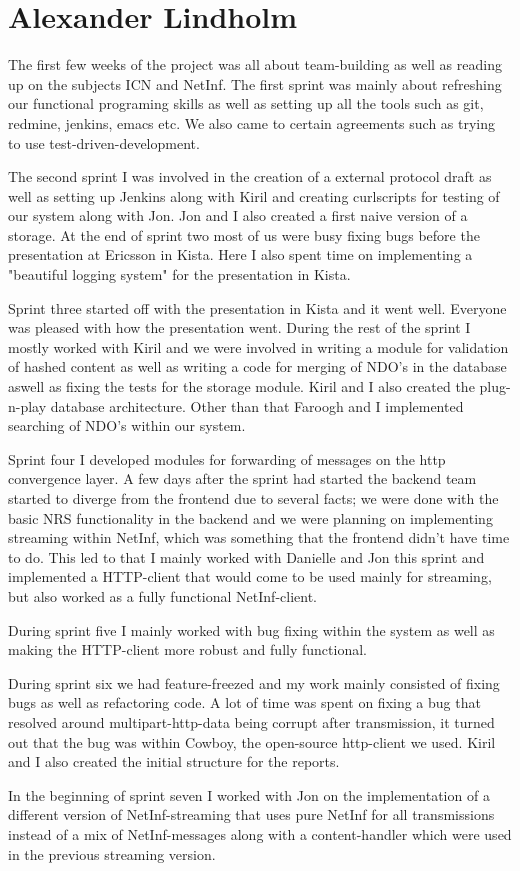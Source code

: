 \section{Alexander Lindholm}
The first few weeks of the project was all about team-building as well as reading up on the subjects ICN and NetInf. The first sprint was mainly about refreshing our functional programing skills as well as setting up all the tools such as git, redmine, jenkins, emacs etc. We also came to certain agreements such as trying to use test-driven-development. 

The second sprint I was involved in the creation of a external protocol draft as well as setting up Jenkins along with Kiril and creating curlscripts for testing of our system along with Jon. Jon and I also created a first naive version of a storage. At the end of sprint two most of us were busy fixing bugs before the presentation at Ericsson in Kista. Here I also spent time on implementing a "beautiful logging system" for the presentation in Kista.

Sprint three started off with the presentation in Kista and it went well. Everyone was pleased with how the presentation went. During the rest of the sprint I mostly worked with Kiril and we were involved in writing a module for validation of hashed content as well as writing a code for merging of NDO's in the database aswell as fixing the tests for the storage module. Kiril and I also created the plug-n-play database architecture. Other than that Faroogh and I implemented searching of NDO's within our system.

Sprint four I developed modules for forwarding of messages on the http convergence layer.
A few days after the sprint had started the backend team started to diverge from the frontend due to several facts;
we were done with the basic NRS functionality in the backend and we were planning on implementing streaming within NetInf, which was something that the frontend didn't have time to do. 
This led to that I mainly worked with Danielle and Jon this sprint and implemented a HTTP-client that would come to be used mainly for streaming, but also worked as a fully functional NetInf-client. 

During sprint five I mainly worked with bug fixing within the system as well as making the HTTP-client more robust and fully functional.

During sprint six we had feature-freezed and my work mainly consisted of fixing bugs as well as refactoring code. A lot of time was spent on fixing a bug that resolved around multipart-http-data being corrupt after transmission, it turned out that the bug was within Cowboy, the open-source http-client we used. Kiril and I also created the initial structure for the reports. 

In the beginning of sprint seven I worked with Jon on the implementation of a different version of NetInf-streaming that uses pure NetInf for all transmissions instead of a mix of NetInf-messages along with a content-handler which were used in the previous streaming version. 

